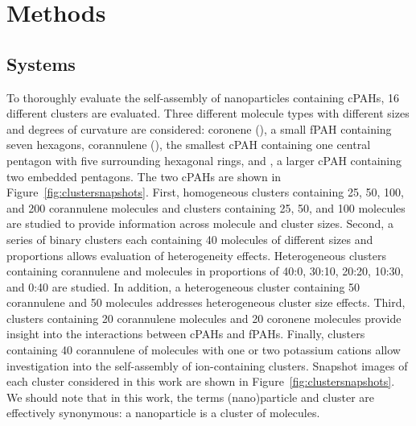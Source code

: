 

\section{Methods}
\subsection{Systems} %
To thoroughly evaluate the self-assembly of nanoparticles containing cPAHs, %
16 different clusters are evaluated. Three different molecule types with different sizes and degrees of curvature are considered: coronene (), a small fPAH containing seven hexagons, corannulene (), the smallest cPAH containing one central pentagon with five surrounding hexagonal rings, and , a larger cPAH containing two embedded pentagons. The two cPAHs are shown in Figure~\ref{fig:clustersnapshots}.
First, homogeneous clusters containing 25, 50, 100, and 200 corannulene molecules and clusters containing 25, 50, and 100  molecules are studied to provide information across molecule and cluster sizes. 
Second, a series of binary clusters each containing 40 molecules of different sizes and proportions allows evaluation of heterogeneity effects. Heterogeneous clusters containing corannulene and  molecules in proportions of 40:0, 30:10, 20:20, 10:30, and 0:40 are studied. In addition, a heterogeneous cluster containing 50 corannulene and 50  molecules addresses heterogeneous cluster size effects.
Third, clusters containing 20 corannulene molecules and 20 coronene molecules provide insight into the interactions between cPAHs and fPAHs.
Finally, clusters containing 40 corannulene of  molecules with one or two potassium cations allow investigation into the self-assembly of ion-containing clusters.
Snapshot images of each cluster considered in this work are shown in Figure~\ref{fig:clustersnapshots}. We should note that in this work, the terms (nano)particle and cluster are effectively synonymous: a nanoparticle is a cluster of molecules.

